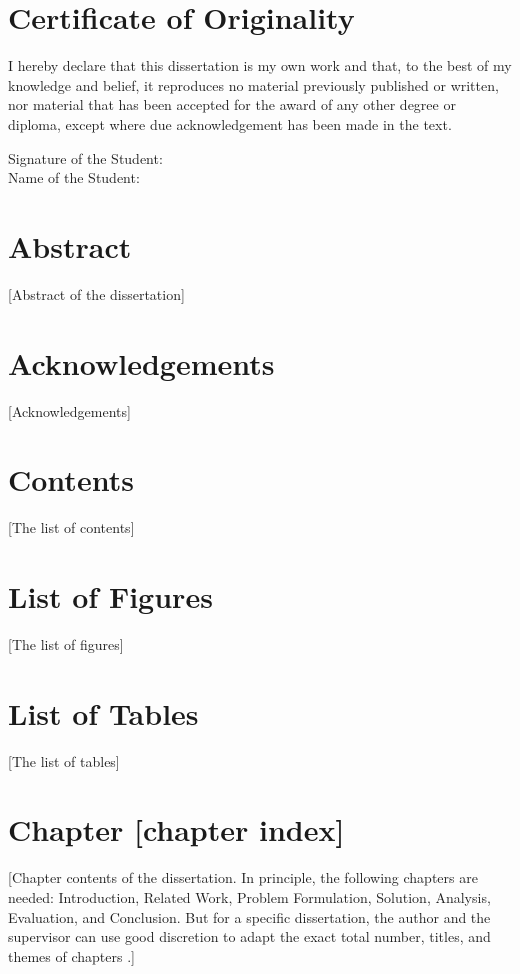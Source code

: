 \documentclass{polyu-comp}
\begin{document}
\printCompCover

\section*{Certificate of Originality}
I hereby declare that this dissertation is my own work and that, to the best of my knowledge and belief, it reproduces no material previously published or written, nor material that has been accepted for the award of any other degree or diploma, except where due acknowledgement has been made in the text.

\vspace{1cm}
Signature of the Student: \underline{\hspace{5cm}} \\[0.5cm]
Name of the Student: \underline{\hspace{5cm}}

\newpage
\section*{Abstract}
[Abstract of the dissertation]

\newpage
\section*{Acknowledgements}
[Acknowledgements]

\newpage
\section*{Contents}
[The list of contents]

\newpage
\section*{List of Figures}
[The list of figures]

\newpage
\section*{List of Tables}
[The list of tables]

\newpage
\section*{Chapter [chapter index]}
[Chapter contents of the dissertation. In principle, the following chapters are needed: Introduction, Related Work, Problem Formulation, Solution, Analysis, Evaluation, and Conclusion. But for a specific dissertation, the author and the supervisor can use good discretion to adapt the exact total number, titles, and themes of chapters \cite{doi:10.1080/15623599.2025.2542912}.]

\clearpage
\renewcommand{\bibname}{References}
\end{document}
